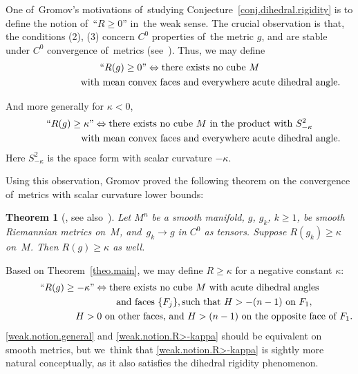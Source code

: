 \documentclass[10pt,a4paper]{amsart}
\numberwithin{equation}{section}
\newtheorem{theo}[prop]{Theorem}
\theoremstyle{definition}
\begin{document}
One of~Gromov's motivations of~studying Conjecture~\ref{conj.dihedral.rigidity} is to define the notion of~``$R\ge 0$'' in~the weak sense. The crucial observation is that, the conditions (2), (3) concern $C^0$ properties of~the metric $g$, and are stable under $C^0$ convergence of~metrics (see~\cite{Gromov2014Dirac}). Thus, we may define{\samepage
\begin{gather*}
\text{``}R(g)\ge 0\text{''} \Leftrightarrow \text{there exists no cube }M \nonumber
\\ \hphantom{\text{``}R(g)\ge 0\text{''} \Leftrightarrow{}}
\text{with mean convex faces and everywhere acute dihedral angle.}%
\end{gather*}}

And more generally for $\kappa<0$,
\begin{gather}
\text{``}R(g)\ge \kappa \text{''} \Leftrightarrow \text{there exists no cube }M \text{ in the product with }S^2_{-\kappa}\nonumber
\\ \hphantom{\text{``}R(g)\ge \kappa \text{''} \Leftrightarrow{}}
\text{with mean convex faces and everywhere acute dihedral angle.}\label{weak.notion.general}
\end{gather}
Here $S^2_{-\kappa}$ is the space form with scalar curvature $-\kappa$.

Using this observation, Gromov proved the following theorem on the convergence of~metrics with scalar curvature lower bounds:

\begin{theo}[\cite{Gromov2014Dirac}, see also~\cite{bamler2016ricci}]
Let $M^n$ be a smooth manifold, $g$, $g_k$, $k\ge 1$, be smooth Riemannian metrics on~$M$, and~$g_k\rightarrow g$ in $C^0$ as tensors. Suppose $R(g_k)\ge \kappa$ on~$M$. Then $R(g)\ge \kappa$ as well.
\end{theo}

Based on Theorem~\ref{theo.main}, we may define $R\ge \kappa$ for a negative constant $\kappa$:
\begin{gather}
\text{``}R(g)\ge -\kappa\text{''} \Leftrightarrow \text{there exists no cube }M \text{ with acute dihedral angles}\nonumber
\\ \hphantom{\text{``}R(g)\ge -\kappa\text{''} \Leftrightarrow{}}
\text{and faces }\{F_j\}, \text{such that } H>-(n-1) \text{ on }F_1,\nonumber
\\ \hphantom{\text{``}R(g)\ge -\kappa\text{''} \Leftrightarrow{}}
H>0 \text{ on other faces, and }H>(n-1) \text{ on the opposite face of~}F_1.\label{weak.notion.R>-kappa}
\end{gather}
\eqref{weak.notion.general} and \eqref{weak.notion.R>-kappa} should be equivalent on smooth metrics, but we~think that \eqref{weak.notion.R>-kappa} is sightly more natural conceptually, as it also satisfies the dihedral rigidity phenomenon.
\end{document}
